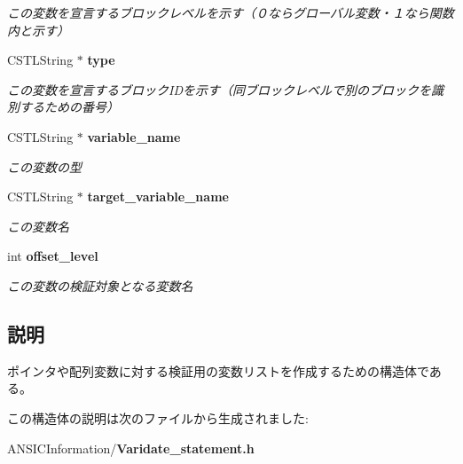 \begin{DoxyCompactItemize}
\begin{DoxyCompactList}\small\item\em この変数を宣言するブロックレベルを示す（０ならグローバル変数・１なら関数内と示す） \item\end{DoxyCompactList}\item 
CSTLString $\ast$ {\bf type}\label{structvalidate__variable_a25c2a484b27cf32f5be46d6fda3b8853}

\begin{DoxyCompactList}\small\item\em この変数を宣言するブロックIDを示す（同ブロックレベルで別のブロックを識別するための番号） \item\end{DoxyCompactList}\item 
CSTLString $\ast$ {\bf variable\_\-name}\label{structvalidate__variable_a2be1b0e38218f7cc1b23644d1a6237ff}

\begin{DoxyCompactList}\small\item\em この変数の型 \item\end{DoxyCompactList}\item 
CSTLString $\ast$ {\bf target\_\-variable\_\-name}\label{structvalidate__variable_aa238dc06f28d558b5bb9ff8732539045}

\begin{DoxyCompactList}\small\item\em この変数名 \item\end{DoxyCompactList}\item 
int {\bf offset\_\-level}\label{structvalidate__variable_a17d23aaef8047824133aa011d7701810}

\begin{DoxyCompactList}\small\item\em この変数の検証対象となる変数名 \item\end{DoxyCompactList}\end{DoxyCompactItemize}


\subsection{説明}
ポインタや配列変数に対する検証用の変数リストを作成するための構造体である。 

この構造体の説明は次のファイルから生成されました:\begin{DoxyCompactItemize}
\item 
ANSICInformation/{\bf Varidate\_\-statement.h}\end{DoxyCompactItemize}
